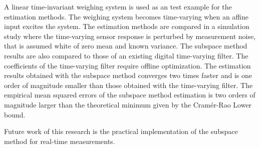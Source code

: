 A linear time-invariant weighing system is used as an test example for the estimation methods.
The weighing system becomes time-varying when an affine input excites the system.
The estimation methods are compared in a simulation study where the time-varying sensor response is perturbed by measurement noise, that is assumed white of zero mean and known variance.
The subspace method results are also compared to those of an existing digital time-varying filter.
The coefficients of the time-varying filter require offline optimization.
The estimation results obtained with the subspace method converges two times faster and is one order of magnitude smaller than those obtained with the time-varying filter.
The empirical mean squared errors of the subspace method estimation is two orders of magnitude larger than the theoretical minimum given by the Cram\'er-Rao Lower bound.

Future work of this research is the practical implementation of the subspace method for real-time measurements.

\newpage
